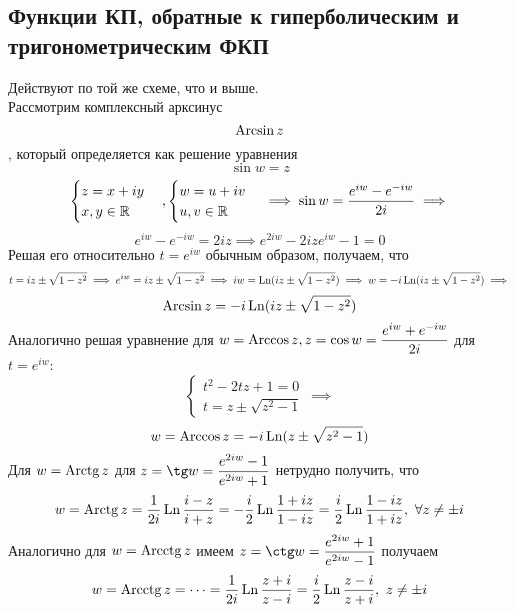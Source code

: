 \documentclass[../../main.tex]{subfiles}
\begin{document}
\subsection{Функции КП, обратные к гиперболическим и тригонометрическим ФКП}

Действуют по той же схеме, что и выше.\\
Рассмотрим комплексный арксинус
\begin{equation}
\label{lec27:23}
\operatorname{Arcsin} z
\end{equation}, который определяется как решение уравнения
\begin{equation}
\label{lec27:24}
\sin w = z
\end{equation}
\[
\begin{cases}
	z = x + iy\\
	x, y \in \mathbb{R}
\end{cases},
\begin{cases}
	w = u + iv\\
	u, v \in \mathbb{R}
\end{cases} \implies
\sin w = \dfrac{e^{iw} - e^{-iw}}{2i} \implies\]\[
e^{iw} - e^{-iw} = 2iz \implies
e^{2iw} - 2ize^{iw} - 1 = 0
\]
Решая его относительно $ t = e^{iw} $ обычным образом, получаем, что
\[
t = iz \pm \sqrt{1 - z^2} \implies
e^{iw} = iz \pm \sqrt{1 - z^2} \implies
iw = \operatorname{Ln}(iz \pm \sqrt{1 - z^2}) \implies
w = -i\operatorname{Ln}(iz \pm \sqrt{1 - z^2}) \implies
\]
\begin{equation}
\label{lec27:25}
\operatorname{Arcsin} z = -i\operatorname{Ln}(iz\pm\sqrt{1 - z^2})
\end{equation}
Аналогично решая уравнение для $ w = \operatorname{Arccos} z, z = \cos w = 
\dfrac{e^{iw} + e^{-iw}}{2i} $ для $ t = e^{iw} $:
\[
\begin{cases}
	t^2 - 2tz + 1 = 0 \\
	t = z \pm \sqrt{z^2 - 1}
\end{cases} \implies
\] 
\begin{equation}
\label{lec27:26}
w = \operatorname{Arccos} z = -i\operatorname{Ln}(z \pm \sqrt{z^2 - 1})
\end{equation}
Для $ w = \operatorname{Arctg} z $ для $ z = \tg w = 
\dfrac{e^{2iw} - 1}{e^{2iw} + 1} $ нетрудно получить, что 
\begin{equation}
\label{lec27:27}
w = \operatorname{Arctg} z = \dfrac{1}{2i} \operatorname{Ln} \dfrac{i - z}{i + z} = 
-\dfrac{i}{2} \operatorname{Ln}\dfrac{1 + iz}{1 - iz} = 
\dfrac{i}{2} \operatorname{Ln}\dfrac{1 - iz}{1 + iz},\ \forall z \neq \pm i
\end{equation}
Аналогично для $ w = \operatorname{Arcctg} z $ имеем $ z = \ctg w = 
\dfrac{e^{2iw} + 1}{e^{2iw} - 1} $ получаем
\begin{equation}
\label{lec27:28}
w = \operatorname{Arcctg} z = \dots = \dfrac{1}{2i} \operatorname{Ln} \dfrac{z + i}{z - i} = 
\dfrac{i}{2} \operatorname{Ln} \dfrac{z - i}{z + i},\ z \neq \pm i
\end{equation}
\end{document}
